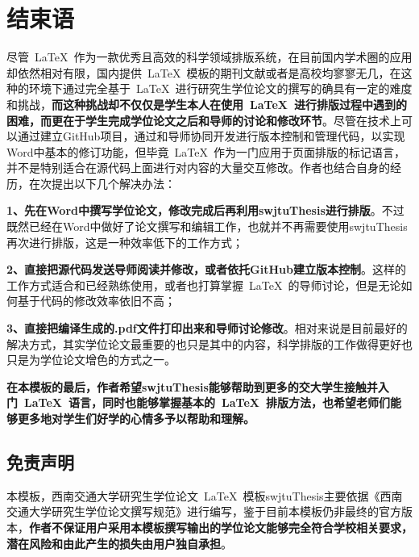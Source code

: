 \chapter{结束语}

尽管~\LaTeX{}~作为一款优秀且高效的科学领域排版系统，在目前国内学术圈的应用却依然相对有限，国内提供~\LaTeX{}~模板的期刊文献或者是高校均寥寥无几，在这种的环境下通过完全基于~\LaTeX{}~进行研究生学位论文的撰写的确具有一定的难度和挑战，\textbf{而这种挑战却不仅仅是学生本人在使用~\LaTeX{}~进行排版过程中遇到的困难，而更在于学生完成学位论文之后和导师的讨论和修改环节}。尽管在技术上可以通过建立GitHub项目，通过和导师协同开发进行版本控制和管理代码，以实现Word中基本的修订功能，但毕竟~\LaTeX{}~作为一门应用于页面排版的标记语言，并不是特别适合在源代码上面进行对内容的大量交互修改。作者也结合自身的经历，在次提出以下几个解决办法：

\par
\textbf{1、先在Word中撰写学位论文，修改完成后再利用swjtuThesis进行排版}。不过既然已经在Word中做好了论文撰写和编辑工作，也就并不再需要使用swjtuThesis再次进行排版，这是一种效率低下的工作方式；

\par
\textbf{2、直接把源代码发送导师阅读并修改，或者依托GitHub建立版本控制}。这样的工作方式适合和已经熟练使用，或者也打算掌握~\LaTeX{}~的导师讨论，但是无论如何基于代码的修改效率依旧不高；

\par
\textbf{3、直接把编译生成的.pdf文件打印出来和导师讨论修改}。相对来说是目前最好的解决方式，其实学位论文最重要的也只是其中的内容，科学排版的工作做得更好也只是为学位论文增色的方式之一。

\par
\textbf{在本模板的最后，作者希望swjtuThesis能够帮助到更多的交大学生接触并入门~\LaTeX{}~语言，同时也能够掌握基本的~\LaTeX{}~排版方法，也希望老师们能够更多地对学生们好学的心情多予以帮助和理解。}

\section{免责声明}
本模板，西南交通大学研究生学位论文~\LaTeX{}~模板swjtuThesis主要依据《西南交通大学研究生学位论文撰写规范》进行编写，鉴于目前本模板仍非最终的官方版本，\textbf{作者不保证用户采用本模板撰写输出的学位论文能够完全符合学校相关要求，潜在风险和由此产生的损失由用户独自承担}。

